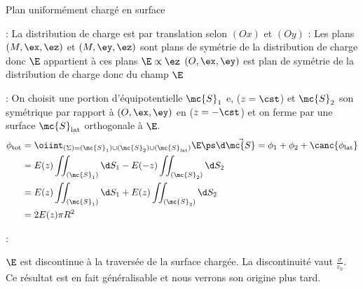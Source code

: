 \documentclass[12pt,fancy]{/Users/victor/Documents/COURS/2ACapECL/texmf/tex/latex/Preambles/cours}
\begin{document}
\begin{exemple}{Plan uniformément chargé en surface}
\begin{center}
\end{center}

\begin{solu}
\begin{enum}
\item {} : La distribution de charge est  par translation selon $(Ox)$ et $(Oy)$ 
\noindent {} : Les plans $(M, \ex, \ez)$ et $(M,\ey,\ez)$ sont plans de symétrie de la distribution de charge donc $\E$ appartient à ces plans $\E \propto \ez$ 
\noindent $(O, \ex, \ey)$ est plan de symétrie de la distribution de charge donc du champ $\E$ 
\item {} : On choisit une portion d'équipotentielle $\mc{S}_{1}$ e, ($z=\cst$) et $\mc{S}_{2}$ son symétrique par rapport à $(O, \ex, \ey)$ en ($z = -\cst$) et on ferme par une surface $\mc{S}_{\rm{lat}}$ orthogonale à $\E$. \begin{align*}
\phi_{\rm{tot}} &= \oiint_{(\Sigma) = (\mc{S}_{1}) \cup (\mc{S}_{2}) \cup (\mc{S}_{\rm{lat}})} \E \ps \d \Vec{\mc{S}} = \phi_{1} + \phi_{2} + \canc{\phi_{\rm{lat}}}\\
&=  E(z) \iint_{(\mc{S}_{1})} \d S_{1} - E(-z) \iint_{(\mc{S}_{2})} \d S_{2} \\
&= E(z) \iint_{(\mc{S}_{1})} \d S_{1} + E(z) \iint_{(\mc{S}_{2})} \d S_{2}\\
&= 2 E(z) \pi R^2
\end{align*}
\item {} : 
\end{enum}

\begin{remarque}
$\E$ est discontinue à la traversée de la surface chargée. La discontinuité vaut $\frac{\sigma}{\varepsilon_{0}}$. Ce résultat est en fait généralisable et nous verrons son origine plus tard.
\end{remarque}


\end{solu}
\end{exemple}
\end{document}
